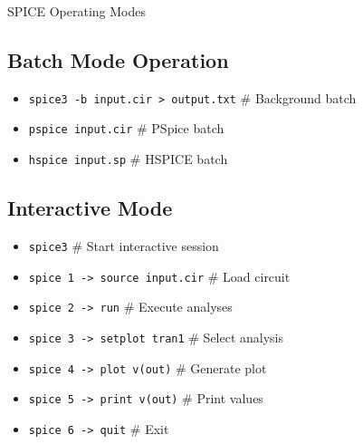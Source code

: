 \documentclass{beamer}
\begin{document}
\begin{frame}{SPICE Operating Modes}
    \subsection{Batch Mode Operation}
    \begin{itemize}
        \item \texttt{spice3 -b input.cir > output.txt} \# Background batch
        \item \texttt{pspice input.cir} \# PSpice batch
        \item \texttt{hspice input.sp} \# HSPICE batch
    \end{itemize}
    
    \subsection{Interactive Mode}
    \begin{itemize}
        \item \texttt{spice3} \# Start interactive session
        \item \texttt{spice 1 -> source input.cir} \# Load circuit
        \item \texttt{spice 2 -> run} \# Execute analyses
        \item \texttt{spice 3 -> setplot tran1} \# Select analysis
        \item \texttt{spice 4 -> plot v(out)} \# Generate plot
        \item \texttt{spice 5 -> print v(out)} \# Print values
        \item \texttt{spice 6 -> quit} \# Exit
    \end{itemize}
\end{frame}
\end{document}
